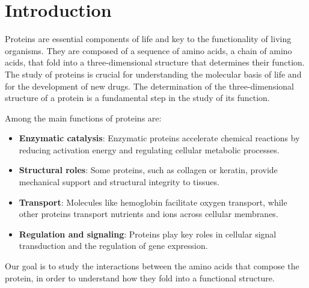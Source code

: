 \documentclass[English, Lau, oneside]{sapthesis}
\title{}
\author{}
\begin{document}
\maketitle
\tableofcontents
{}
\tableofcontents



    

\dedication{}

\newpage
\null
\thispagestyle{empty}
\newpage




\newpage
\null
\thispagestyle{empty}
\newpage



\chapter*{Introduction}
\noindent
Proteins are essential components of life and key to the functionality of living organisms. \cite{ref}
They are composed of a sequence of amino acids, a chain of amino acids, that fold into a three-dimensional structure that determines their function. 
The study of proteins is crucial for understanding the molecular basis of life and for the development of new drugs.
The determination of the three-dimensional structure of a protein is a fundamental step in the study of its function.

Among the main functions of proteins are:\cite{ref}
\begin{itemize}
    \item \textbf{Enzymatic catalysis}: Enzymatic proteins accelerate chemical reactions by reducing activation energy and regulating cellular metabolic processes.
    \item \textbf{Structural roles}: Some proteins, such as collagen or keratin, provide mechanical support and structural integrity to tissues.
    \item \textbf{Transport}: Molecules like hemoglobin facilitate oxygen transport, while other proteins transport nutrients and ions across cellular membranes.
    \item \textbf{Regulation and signaling}: Proteins play key roles in cellular signal transduction and the regulation of gene expression.
\end{itemize}
Our goal is to study the interactions between the amino acids that compose the protein, 
in order to understand how they fold into a functional structure.
\end{document}
